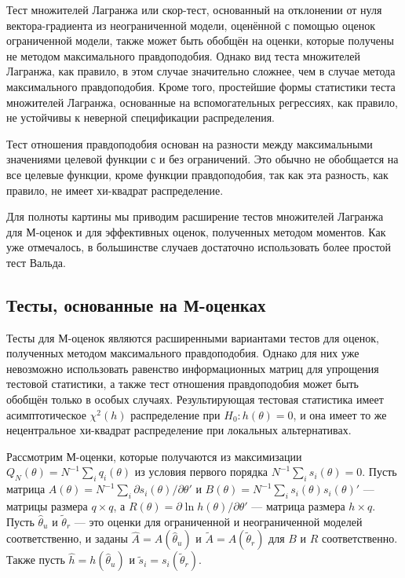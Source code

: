 Тест множителей Лагранжа или скор-тест, основанный на отклонении от нуля вектора-градиента из неограниченной модели, оценённой с помощью оценок ограниченной модели, также может быть обобщён на оценки, которые получены не методом максимального правдоподобия. Однако вид теста множителей Лагранжа, как правило, в этом случае значительно сложнее, чем в случае метода максимального правдоподобия. Кроме того, простейшие формы статистики теста множителей Лагранжа, основанные на вспомогательных регрессиях, как правило, не устойчивы к неверной спецификации распределения.

Тест отношения правдоподобия основан на разности между максимальными значениями целевой функции с и без ограничений. Это обычно не обобщается на все целевые функции, кроме функции правдоподобия, так как эта разность, как правило, не имеет хи-квадрат распределение.

Для полноты картины мы приводим расширение тестов множителей Лагранжа для М-оценок и для эффективных оценок, полученных методом моментов. Как уже отмечалось, в большинстве случаев достаточно использовать более простой тест Вальда.

\subsection{Тесты, основанные на М-оценках}

Тесты для М-оценок являются расширенными вариантами тестов для оценок, полученных методом максимального правдоподобия. Однако для них уже невозможно использовать равенство информационных матриц для упрощения тестовой статистики, а также тест отношения правдоподобия может быть обобщён только в особых случаях. Результирующая тестовая статистика имеет асимптотическое $\chi^2(h)$ распределение при $H_0: h(\theta) = 0$, и она имеет то же нецентральное хи-квадрат распределение при локальных альтернативах.

Рассмотрим М-оценки, которые получаются из максимизации $Q_N(\theta) = N^{-1}\sum_i q_i(\theta)$ из условия первого порядка $N^{-1}\sum_i s_i(\theta) = 0$. Пусть матрица $A(\theta) = N^{-1}\sum_i \partial{s_i(\theta)}/\partial{\theta}'$ и $B(\theta) = N^{-1}\sum_i s_i(\theta)s_i(\theta)'$ --- матрицы размера $q \times q$, а $R(\theta) = \partial{\ln h(\theta)}/\partial{\theta}'$ --- матрица размера $h \times q$. Пусть $\hat{\theta}_u$ и $\tilde{\theta}_r$ --- это оценки для ограниченной и неограниченной моделей соответственно, и заданы $\hat{A} = A(\hat{\theta}_u)$ и $\tilde{A}= A(\tilde{\theta}_r)$ для $B$ и $R$ соответственно. Также пусть $\hat{h} = h(\hat{\theta}_u)$ и $\tilde{s}_i = s_i(\tilde{\theta}_r)$.

